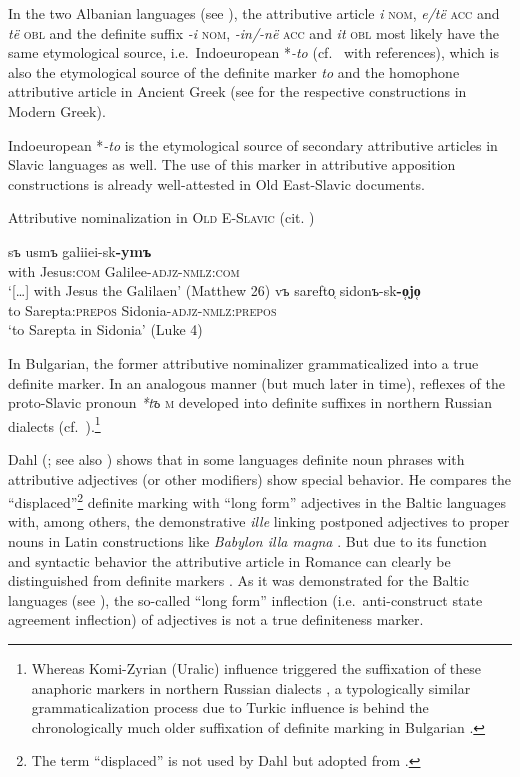 {In the two Albanian languages (see ), the attributive article \textit{i} \textsc{nom}, \textit{e/të} \textsc{acc} and \textit{të} \textsc{obl} and the definite suffix \textit{-i} \textsc{nom}, \textit{-in/-në} \textsc{acc} and \textit{it} \textsc{obl} most likely have the same etymological source, i.e.~Indoeuropean *\textit{-to} (cf.~\citet[165]{himmelmann1997} with references), which is also the etymological source of the definite marker \textit{to} and the homophone attributive article in Ancient Greek (see  for the respective constructions in Modern Greek).

Indoeuropean *\textit{-to} is the etymological source of secondary attributive articles in Slavic languages as well. The use of this marker in attributive apposition constructions is already well-attested in Old East-Slavic documents.
\begin{exe}
\ex Attributive nominalization in \textsc{Old E-Slavic} (cit. \citealt[214]{mendoza2004})
\begin{xlist}
\ex
\gll	[\dots] sъ usmъ galiiei-sk\textbf{-ymъ}\\
	{ } with Jesus:\textsc{com} Galilee-\textsc{adjz}-\textsc{nmlz:com}\\
\glt 	‘[\dots] with Jesus the Galilaen’ (Matthew 26)
\ex 
\gll	vъ sarefto̜ sidonъ-sk\textbf{-o̜jo̜}\\
	to Sarepta:\textsc{prepos} Sidonia-\textsc{adjz}-\textsc{nmlz:prepos}\\
\glt 	‘to Sarepta in Sidonia’ (Luke 4)
\end{xlist}
\end{exe}
In Bulgarian, the former attributive nominalizer grammaticalized into a true definite marker. In an analogous manner (but much later in time), reflexes of the proto-Slavic pronoun \textit{*tъ} \textsc{m} developed into definite suffixes in northern Russian dialects (cf.~\citealt
{leinonen2006a}).\footnote{Whereas Komi-Zyrian (Uralic) influence triggered the suffixation of these anaphoric markers in northern Russian dialects \citep
{leinonen2006a}, a typologically similar grammaticalization process due to Turkic influence is behind the chronologically much older suffixation of definite marking in Bulgarian \citep[114–122]{kusmenko2008}.}

Dahl (\citeyear[149–152]{dahl2003}; see also \citealt[115]{dahl2007}) shows that in some languages definite noun phrases with attributive adjectives (or other modifiers) show special behavior. He compares the “displaced”\footnote{The term “displaced” is not used by Dahl but adopted from \citet[114–116]{melcuk2006}.} definite marking with “long form” adjectives in the Baltic languages with, among others, the demonstrative \textit{ille} linking postponed adjectives to proper nouns in Latin constructions like \textit{Babylon illa magna} \cite[150]{dahl2003}. But due to its function and syntactic behavior the attributive article in Romance can clearly be distinguished from definite markers \citep[329]{gamillscheg1937}. As it was demonstrated for the Baltic languages (see ), the so-called “long form” inflection (i.e.~anti-construct state agreement inflection) of adjectives is not a true definiteness marker.

}
